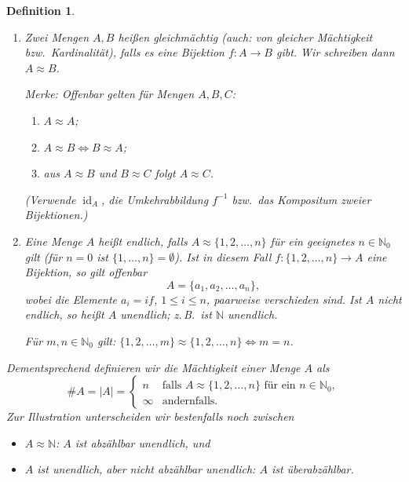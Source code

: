 \documentclass[a4paper]{article}
\theoremstyle{kurzskript}
\newtheorem{definition}[satz]{Definition}
\newcommand{\N}{\mathbb{N}}
\begin{document}
\begin{definition}
\leavevmode
\begin{enumerate}[label=(\alph*)]
  \item Zwei Mengen $A, B$ heißen \emph{gleichmächtig} (auch: von gleicher \emph{Mächtigkeit} bzw.\ \emph{Kardinalität}), falls es eine Bijektion $f\colon A \to B$ gibt. Wir schreiben dann $A \approx B$.

  \emph{Merke:} Offenbar gelten für Mengen $A, B, C$:
  \begin{enumerate}[label=(\roman*)]
    \item $A \approx A$;
    \item $A \approx B \iff B \approx A$;
    \item aus $A \approx B$ und $B \approx C$ folgt $A \approx C$.
  \end{enumerate}
  (Verwende $\operatorname{id}_A$, die Umkehrabbildung $f^{-1}$ bzw.\ das Kompositum zweier Bijektionen.)

  \item Eine Menge $A$ heißt \emph{endlich}, falls $A \approx \{1, 2, \dots, n\}$ für ein geeignetes $n \in \N_0$ gilt (für $n = 0$ ist $\{1, \dots, n\} = \emptyset$). Ist in diesem Fall $f\colon \{1, 2, \dots, n\} \to A$ eine Bijektion, so gilt offenbar
  \[
    A = \{a_1, a_2, \dots, a_n\},
  \]
  wobei die Elemente $a_i = if$, $1 \leq i \leq n$, paarweise verschieden sind. Ist $A$ nicht endlich, so heißt $A$ \emph{unendlich}; z.\,B.\ ist $\N$ unendlich.

  Für $m, n \in \N_0$ gilt: $\{1, 2, \dots, m\} \approx \{1, 2, \dots, n\} \iff m = n$.
\end{enumerate}
Dementsprechend definieren wir die \emph{Mächtigkeit} einer Menge $A$ als
\[
  \#A = |A| =
  \begin{cases}
    n & \text{falls } A \approx \{1, 2, \dots, n\} \text{ für ein } n \in \N_0,\\
    \infty & \text{andernfalls.}
  \end{cases}
\]
Zur Illustration unterscheiden wir bestenfalls noch zwischen
\begin{itemize}
  \item $A \approx \N$: $A$ ist \emph{abzählbar unendlich}, und
  \item $A$ ist unendlich, aber nicht abzählbar unendlich: $A$ ist \emph{überabzählbar}.
\end{itemize}
\end{definition}
\end{document}
